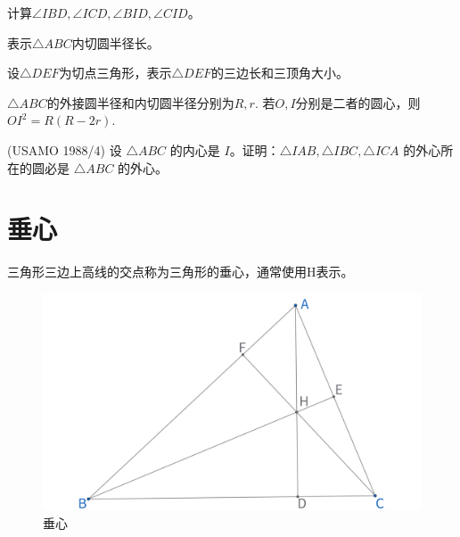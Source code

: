 \begin{exercise}
    计算$\angle IBD, \angle ICD, \angle BID, \angle CID$。
\end{exercise}
\begin{exercise}
    表示$\triangle ABC$内切圆半径长。
\end{exercise}
\begin{exercise}
    设$\triangle DEF$为切点三角形，表示$\triangle DEF$的三边长和三顶角大小。
\end{exercise}
\begin{exercise}[内外径的欧拉定理]
    $\triangle ABC$的外接圆半径和内切圆半径分别为$R,r.$ 若$O,I$分别是二者的圆心，则$OI^2 = R(R-2r).$
\end{exercise}
\begin{exercise}
    (USAMO 1988/4) 设 $\triangle ABC$ 的内心是 $I$。证明：$\triangle IAB, \triangle IBC, \triangle ICA$ 的外心所在的圆必是 $\triangle ABC$ 的外心。
\end{exercise}



\newpage
\section{垂心}
\begin{definition}[垂心]
    三角形三边上高线的交点称为三角形的垂心，通常使用H表示。
\end{definition}

\begin{figure}[H]
    \centering
    \includegraphics[width=0.8\linewidth]{figures/三角形五心/垂心.png}
    \caption{垂心}
\end{figure}

